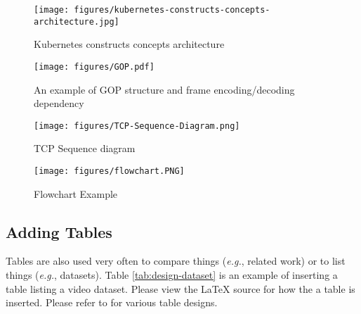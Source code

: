 

\begin{figure}[htbp]
\begin{center}
    \texttt{[image: figures/kubernetes-constructs-concepts-architecture.jpg]}
\end{center}
\caption{Kubernetes constructs concepts architecture \cite{kubernetes-image}}
\label{fig:kubernetes}
\end{figure}

\begin{figure}[htbp]
\begin{center}
\texttt{[image: figures/GOP.pdf]}
\end{center}
\caption{An example of GOP structure and frame encoding/decoding dependency \cite{james2019beta}}
\label{fig:design-GOP}
\end{figure}

\begin{figure}[htbp]
\begin{center}
    \texttt{[image: figures/TCP-Sequence-Diagram.png]}
\end{center}
\caption{TCP Sequence diagram \cite{tcp-image} }
\label{fig:tcp}
\end{figure}

\begin{figure}[htbp]
\begin{center}
    \texttt{[image: figures/flowchart.PNG]}
\end{center}
\caption{Flowchart Example \cite{flowchart-image}}
\label{fig:flowchart-example}
\end{figure}



\subsection{Adding Tables}
\label{sec:design-table}

Tables are also used very often to compare things ({\em e.g.}, related work) or to list things ({\em e.g.}, datasets).  Table \ref{tab:design-dataset} is an example of inserting a table listing a video dataset.  Please view the \LaTeX $ $ source for how the a table is inserted. Please refer to \cite{latex-table} for various table designs.

